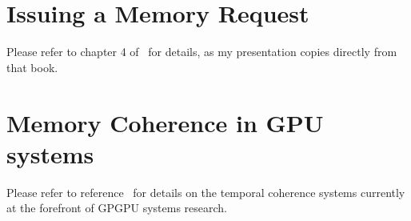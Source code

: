 \chapter{Issuing a Memory Request}

Please refer to chapter 4 of~\cite{GPGPUbook} for details, as my presentation copies directly from that book.

\chapter{Memory Coherence in GPU systems}

Please refer to reference~\cite{temporalcoherence} for details on the temporal coherence systems currently at the forefront of GPGPU systems research.
